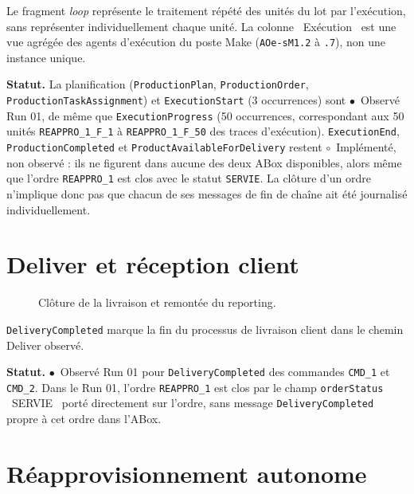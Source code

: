 \documentclass[11pt,a4paper]{article}
\newcommand{\code}[1]{\texttt{#1}}
\newcommand{\stRUN}{\ensuremath{\bullet}~Observé Run 01}
\newcommand{\stIMP}{\ensuremath{\circ}~Implémenté, non observé}
\newcommand{\statut}[1]{\textbf{Statut.} #1}
\begin{document}
Le fragment \emph{loop} représente le traitement répété des unités du lot par l'exécution, sans représenter individuellement chaque unité. La colonne \og{}~Exécution~\fg{} est une vue agrégée des agents d'exécution du poste Make (\code{AOe-sM1.2} à \code{.7}), non une instance unique.

\statut{La planification (\code{ProductionPlan}, \code{ProductionOrder}, \code{ProductionTaskAssignment}) et \code{ExecutionStart} (3 occurrences) sont \stRUN, de même que \code{ExecutionProgress} (50 occurrences, correspondant aux 50 unités \code{REAPPRO\_1\_F\_1} à \code{REAPPRO\_1\_F\_50} des traces d'exécution). \code{ExecutionEnd}, \code{ProductionCompleted} et \code{ProductAvailableForDelivery} restent \stIMP{} : ils ne figurent dans aucune des deux ABox disponibles, alors même que l'ordre \code{REAPPRO\_1} est clos avec le statut \code{SERVIE}. La clôture d'un ordre n'implique donc pas que chacun de ses messages de fin de chaîne ait été journalisé individuellement.}

\section{Deliver et réception client}
\label{sec:deliver}

\begin{figure}[H]
\centering
\resizebox{\textwidth}{!}{}
\caption{Clôture de la livraison et remontée du reporting.}
\label{fig:seq06}
\end{figure}

\code{DeliveryCompleted} marque la fin du processus de livraison client dans le chemin Deliver observé.

\statut{\stRUN{} pour \code{DeliveryCompleted} des commandes \code{CMD\_1} et \code{CMD\_2}. Dans le Run 01, l'ordre \code{REAPPRO\_1} est clos par le champ \code{orderStatus} \og{}~SERVIE~\fg{} porté directement sur l'ordre, sans message \code{DeliveryCompleted} propre à cet ordre dans l'ABox.}

\section{Réapprovisionnement autonome}
\label{sec:reappro}
\end{document}
